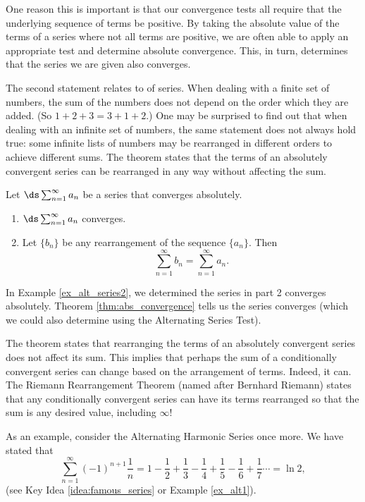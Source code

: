One reason this is important is that our convergence tests all require that the underlying sequence of terms be positive. By taking the absolute value of the terms of a series where not all terms are positive, we are often able to apply an appropriate test and determine absolute convergence. This, in turn, determines that the series we are given also converges.

The second statement relates to  of series. When dealing with a finite set of numbers, the sum of the numbers does not depend on the order which they are added. (So $1+2+3 = 3+1+2$.) One may be surprised to find out that when dealing with an infinite set of numbers, the same statement does not always hold true: some infinite lists of numbers may be rearranged in different orders to achieve different sums. The theorem states that the terms of an absolutely convergent series can be rearranged in any way without affecting the sum.

{Let $\ds \sum_{n=1}^\infty a_n$ be a series that converges absolutely.
\begin{enumerate}
	\item $\ds \sum_{n=1}^\infty a_n$ converges.
	
	\item	Let $\{b_n\}$ be any rearrangement of the sequence $\{a_n\}$. Then 
	$$ \sum_{n=1}^\infty b_n = \sum_{n=1}^\infty a_n.$$
\end{enumerate}
}

In Example \ref{ex_alt_series2}, we determined the series in part 2 converges absolutely. Theorem \ref{thm:abs_convergence} tells us the series converges (which we could also determine using the Alternating Series Test).

The theorem states that rearranging the terms of an absolutely convergent series does not affect its sum. This implies that perhaps the sum of a conditionally convergent series can change based on the arrangement of terms. Indeed, it can. The Riemann Rearrangement Theorem (named after Bernhard Riemann) states that any conditionally convergent series can have its terms rearranged so that the sum is any desired value, including $\infty$!

As an example, consider the Alternating Harmonic Series once more. We have stated that 
$$\sum_{n=1}^\infty (-1)^{n+1}\frac1n = 1-\frac12+\frac13-\frac14+\frac15-\frac16+\frac17\cdots = \ln 2,$$
(see Key Idea \ref{idea:famous_series} or Example \ref{ex_alt1}). 


